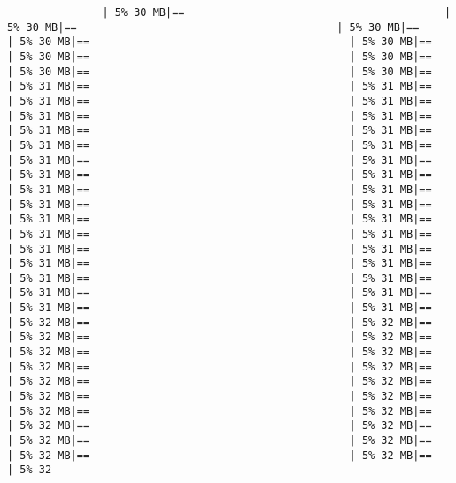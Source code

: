 \documentclass[
]{article}
\begin{document}
\begin{verbatim}
               | 5% 30 MB|==                                         | 5% 30 MB|==                                         | 5% 30 MB|==                                         | 5% 30 MB|==                                         | 5% 30 MB|==                                         | 5% 30 MB|==                                         | 5% 30 MB|==                                         | 5% 30 MB|==                                         | 5% 30 MB|==                                         | 5% 31 MB|==                                         | 5% 31 MB|==                                         | 5% 31 MB|==                                         | 5% 31 MB|==                                         | 5% 31 MB|==                                         | 5% 31 MB|==                                         | 5% 31 MB|==                                         | 5% 31 MB|==                                         | 5% 31 MB|==                                         | 5% 31 MB|==                                         | 5% 31 MB|==                                         | 5% 31 MB|==                                         | 5% 31 MB|==                                         | 5% 31 MB|==                                         | 5% 31 MB|==                                         | 5% 31 MB|==                                         | 5% 31 MB|==                                         | 5% 31 MB|==                                         | 5% 31 MB|==                                         | 5% 31 MB|==                                         | 5% 31 MB|==                                         | 5% 31 MB|==                                         | 5% 31 MB|==                                         | 5% 31 MB|==                                         | 5% 31 MB|==                                         | 5% 31 MB|==                                         | 5% 31 MB|==                                         | 5% 31 MB|==                                         | 5% 31 MB|==                                         | 5% 31 MB|==                                         | 5% 31 MB|==                                         | 5% 31 MB|==                                         | 5% 32 MB|==                                         | 5% 32 MB|==                                         | 5% 32 MB|==                                         | 5% 32 MB|==                                         | 5% 32 MB|==                                         | 5% 32 MB|==                                         | 5% 32 MB|==                                         | 5% 32 MB|==                                         | 5% 32 MB|==                                         | 5% 32 MB|==                                         | 5% 32 MB|==                                         | 5% 32 MB|==                                         | 5% 32 MB|==                                         | 5% 32 MB|==                                         | 5% 32 MB|==                                         | 5% 32 MB|==                                         | 5% 32 MB|==                                         | 5% 32 MB|==                                         | 5% 32 MB|==                                         | 5% 32 MB|==                                         | 5% 32 
\end{verbatim}
\end{document}
